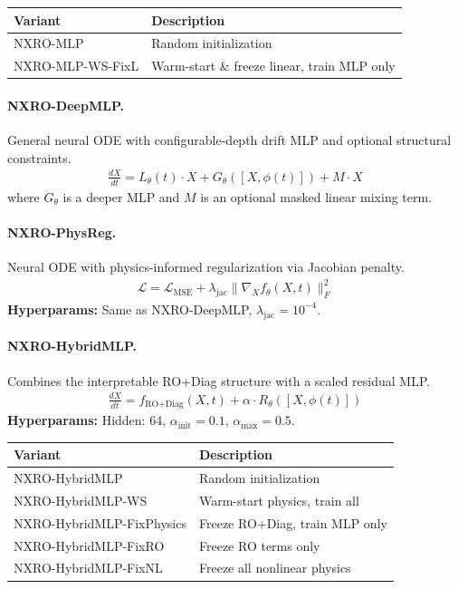 \begin{tabular}{@{}ll@{}}
\textbf{Variant} & \textbf{Description} \\
\hline
NXRO-MLP & Random initialization \\
NXRO-MLP-WS-FixL & Warm-start \& freeze linear, train MLP only \\
\end{tabular}

\paragraph{NXRO-DeepMLP.}
General neural ODE with configurable-depth drift MLP and optional structural constraints.
\begin{align*}
    \frac{dX}{dt} = L_\theta(t) \cdot X + G_\theta([X, \phi(t)]) + M \cdot X
\end{align*}
where $G_\theta$ is a deeper MLP and $M$ is an optional masked linear mixing term.

\paragraph{NXRO-PhysReg.}
Neural ODE with physics-informed regularization via Jacobian penalty.
\begin{align*}
    \mathcal{L} = \mathcal{L}_{\text{MSE}} + \lambda_{\text{jac}} \|\nabla_X f_\theta(X,t)\|_F^2
\end{align*}
\textbf{Hyperparams:} Same as NXRO-DeepMLP, $\lambda_{\text{jac}} = 10^{-4}$.

\paragraph{NXRO-HybridMLP.}
Combines the interpretable RO+Diag structure with a scaled residual MLP.
\begin{align*}
    \frac{dX}{dt} = f_{\text{RO+Diag}}(X,t) + \alpha \cdot R_\theta([X, \phi(t)])
\end{align*}
\textbf{Hyperparams:} Hidden: 64, $\alpha_{\text{init}} = 0.1$, $\alpha_{\max} = 0.5$.

\begin{tabular}{@{}ll@{}}
\textbf{Variant} & \textbf{Description} \\
\hline
NXRO-HybridMLP & Random initialization \\
NXRO-HybridMLP-WS & Warm-start physics, train all \\
NXRO-HybridMLP-FixPhysics & Freeze RO+Diag, train MLP only \\
NXRO-HybridMLP-FixRO & Freeze RO terms only \\
NXRO-HybridMLP-FixNL & Freeze all nonlinear physics \\
\end{tabular}

